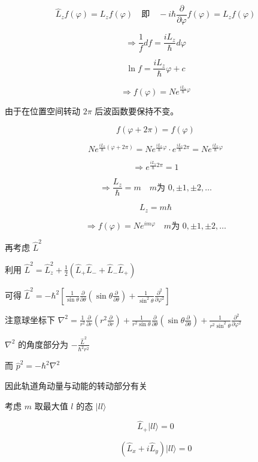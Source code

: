 \documentclass[lang=cn,10pt]{elegantbook}
\begin{document}
\[
\hat{L}_z f(\varphi) = L_z f(\varphi) \quad \text{即} \quad -i\hbar \frac{\partial}{\partial \varphi} f(\varphi) = L_z f(\varphi)
\]

\[
\Rightarrow \frac{1}{f} df = \frac{iL_z}{\hbar} d\varphi
\]

\[
\ln f = \frac{iL_z}{\hbar} \varphi + c
\]

\[
\Rightarrow f(\varphi) = N e^{\frac{iL_z}{\hbar} \varphi}
\]

由于在位置空间转动 \(2\pi\) 后波函数要保持不变。

\[
f(\varphi + 2\pi) = f(\varphi)
\]

\[
N e^{\frac{iL_z}{\hbar} (\varphi+2\pi)} = N e^{\frac{iL_z}{\hbar} \varphi} \cdot e^{\frac{iL_z}{\hbar} 2\pi} = N e^{\frac{iL_z}{\hbar} \varphi}
\]

\[
\Rightarrow e^{\frac{iL_z}{\hbar} 2\pi} = 1
\]

\[
\Rightarrow \frac{L_z}{\hbar} = m \quad m \text{为 } 0, \pm1, \pm2, \ldots
\]

\[
L_z = m\hbar
\]

\[
\Rightarrow f(\varphi) = N e^{im\varphi} \quad m \text{为 } 0, \pm1, \pm2, \ldots
\]

再考虑 $\hat{L}^2$

利用 $\hat{L}^2 = \hat{L}_z^2 + \frac{1}{2}(\hat{L}_+ \hat{L}_- + \hat{L}_- \hat{L}_+)$

可得 $\hat{L}^2 = -\hbar^2 \left[ \frac{1}{\sin\theta} \frac{\partial}{\partial \theta} \left( \sin\theta \frac{\partial}{\partial \theta} \right) + \frac{1}{\sin^2\theta} \frac{\partial^2}{\partial \varphi^2} \right]$

注意球坐标下 $\nabla^2 = \frac{1}{r^2} \frac{\partial}{\partial r} \left( r^2 \frac{\partial}{\partial r} \right) + \frac{1}{r^2 \sin\theta} \frac{\partial}{\partial \theta} \left( \sin\theta \frac{\partial}{\partial \theta} \right) + \frac{1}{r^2 \sin^2\theta} \frac{\partial^2}{\partial \varphi^2}$

$\nabla^2$ 的角度部分为 $-\frac{\hat{L}^2}{\hbar^2 r^2}$

而 $\hat{p}^2 = -\hbar^2 \nabla^2$

因此轨道角动量与动能的转动部分有关

考虑 $m$ 取最大值 $l$ 的态 $|l l \rangle$

\begin{equation}
	\hat{L}_+ |l l\rangle = 0
\end{equation}

\begin{equation}
	(\hat{L}_x + i\hat{L}_y) |l l\rangle = 0
\end{equation}
\end{document}
